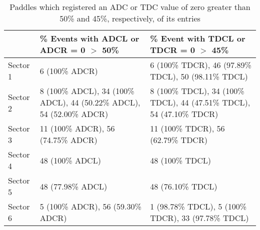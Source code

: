 \begin{table}
\begin{minipage}{\textwidth}
\begin{center}
\begin{singlespacing}

\caption{\label{tab:adctdc0}Paddles which registered an ADC or TDC value of zero greater than 50\% and 45\%, respectively, of its entries}

\begin{tabular}{lp{}p{}}

\hline \hline

 &  \% Events with ADCL or ADCR = 0 \( > \) 50\% &  \% Event with TDCL or TDCR = 0 \( > \) 45\% \\
 
\hline

Sector 1 & 6 (100\% ADCR) & 6 (100\% TDCR), 46 (97.89\% TDCL), 50 (98.11\% TDCL) \\
Sector 2 & 8 (100\% ADCL), 34 (100\% ADCL), 44 (50.22\% ADCL), 54 (52.00\% ADCR) &  8 (100\% TDCL), 34 (100\% TDCL), 44 (47.51\% TDCL), 54 (47.10\% TDCR)\\
Sector 3 & 11 (100\% ADCR), 56 (74.75\% ADCR) & 11 (100\% TDCR), 56 (62.79\% TDCR)\\
Sector 4 & 48 (100\% ADCL) & 48 (100\% TDCL) \\
Sector 5 & 48 (77.98\% ADCL) & 48 (76.10\% TDCL)\\
Sector 6 & 5 (100\% ADCR), 56 (59.30\% ADCR) & 1 (98.78\% TDCL), 5 (100\% TDCR), 33 (97.78\% TDCL) \\

\hline \hline

\end{tabular}

\end{singlespacing}
\end{center}
\end{minipage}
\end{table}
